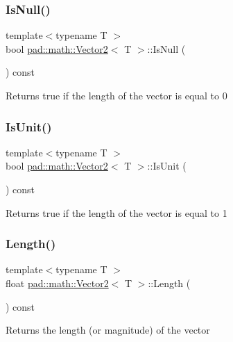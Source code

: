 \subsubsection{\texorpdfstring{Is\+Null()}{IsNull()}}
{\footnotesize\ttfamily template$<$typename T $>$ \\
bool \mbox{\hyperlink{structpad_1_1math_1_1_vector2}{pad\+::math\+::\+Vector2}}$<$ T $>$\+::Is\+Null (\begin{DoxyParamCaption}{ }\end{DoxyParamCaption}) const}

Returns true if the length of the vector is equal to 0 \mbox{\label{structpad_1_1math_1_1_vector2_ac89422aa3df0d31115df268982e9bb0e}} 
\subsubsection{\texorpdfstring{Is\+Unit()}{IsUnit()}}
{\footnotesize\ttfamily template$<$typename T $>$ \\
bool \mbox{\hyperlink{structpad_1_1math_1_1_vector2}{pad\+::math\+::\+Vector2}}$<$ T $>$\+::Is\+Unit (\begin{DoxyParamCaption}{ }\end{DoxyParamCaption}) const}

Returns true if the length of the vector is equal to 1 \mbox{\label{structpad_1_1math_1_1_vector2_a8e02a8ac515710f437624863b1ce1655}} 
\subsubsection{\texorpdfstring{Length()}{Length()}}
{\footnotesize\ttfamily template$<$typename T $>$ \\
float \mbox{\hyperlink{structpad_1_1math_1_1_vector2}{pad\+::math\+::\+Vector2}}$<$ T $>$\+::Length (\begin{DoxyParamCaption}{ }\end{DoxyParamCaption}) const}

Returns the length (or magnitude) of the vector \mbox{\label{structpad_1_1math_1_1_vector2_a58d0df7fcb5f69cebce9e28fc94bf8f5}} 
